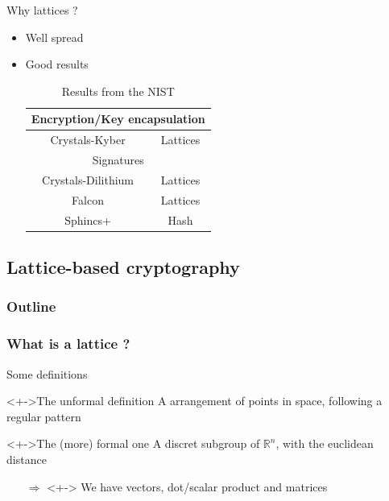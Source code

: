 \documentclass{beamer}
\begin{document}
\begin{frame}{Why lattices ?}
	\begin{itemize}
		\item Well spread
		\item Good results
			\begin{table}[h!]
			\begin{tabular}{|c|c|}
				\hline
				\multicolumn{2}{|c|}{Encryption/Key encapsulation} \\
				\hline
				Crystals-Kyber & Lattices \\
				\hline
				\multicolumn{2}{|c|}{Signatures} \\
				\hline
				Crystals-Dilithium & Lattices \\
				Falcon & Lattices \\
				Sphincs+ & Hash \\
				\hline
			\end{tabular}
			\caption{Results from the NIST}
			\end{table}
	\end{itemize}
\end{frame}

\subsection{Lattice-based cryptography}
\begin{frame}
  \frametitle{Outline}
\end{frame}

\subsubsection{What is a lattice ?}
\begin{frame}{Some definitions}
	\begin{block}<+->{The unformal definition}
		A arrangement of points in space, following a regular pattern
	\end{block}

	\begin{block}<+->{The (more) formal one}
		A discret subgroup of $\mathbb{R}^n$, with the euclidean distance
	\end{block}
	\begin{itemize}
		\item[$\Rightarrow$]<+-> We have vectors, dot/scalar product and matrices
	\end{itemize}
\end{frame}
\end{document}

